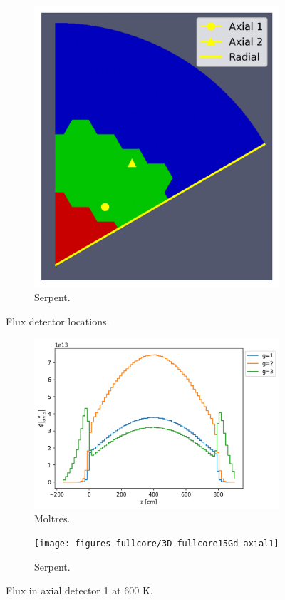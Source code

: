 \documentclass[11pt,letterpaper]{article}
\begin{document}
\begin{figure}[htbp!]
\begin{subfigure}[t]{0.4\textwidth}
		\includegraphics[width=\linewidth]{figures-fullcore/3D-fullcore-60-detectors}
		\caption{Serpent.}
	\end{subfigure}
	\hfill
	\caption{Flux detector locations.}
	\label{fig:fullcore-detectors}
\end{figure}

\begin{figure}[htbp!]
	\centering
	\begin{subfigure}[t]{0.4\textwidth}
		\centering
		\includegraphics[width=\linewidth]{figures-fullcore/serpent26G-600-collapse-Axial1}
		\caption{Moltres.}
	\end{subfigure}
	\begin{subfigure}[t]{0.4\textwidth}
		\centering
		\texttt{[image: figures-fullcore/3D-fullcore15Gd-axial1]}
		\caption{Serpent.}
	\end{subfigure}
	\hfill
	\caption{Flux in axial detector 1 at 600 K.}
	\label{fig:fullcore-axial1}
\end{figure}
\end{document}
